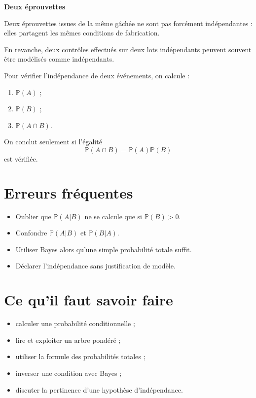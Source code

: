 \begin{Ex}
\textbf{Deux éprouvettes}

Deux éprouvettes issues de la même gâchée ne sont pas forcément indépendantes : elles partagent les mêmes conditions de fabrication.

En revanche, deux contrôles effectués sur deux lots indépendants peuvent souvent être modélisés comme indépendants.
\end{Ex}

\begin{Meth}
Pour vérifier l'indépendance de deux événements, on calcule :
\begin{enumerate}
    \item $\mathbb{P}(A)$ ;
    \item $\mathbb{P}(B)$ ;
    \item $\mathbb{P}(A\cap B)$.
\end{enumerate}

On conclut seulement si l'égalité
$$
\mathbb{P}(A\cap B)=\mathbb{P}(A)\mathbb{P}(B)
$$
est vérifiée.
\end{Meth}

\section{Erreurs fréquentes}

\begin{itemize}
    \item Oublier que $\mathbb{P}(A|B)$ ne se calcule que si $\mathbb{P}(B)>0$.
    \item Confondre $\mathbb{P}(A|B)$ et $\mathbb{P}(B|A)$.
    \item Utiliser Bayes alors qu'une simple probabilité totale suffit.
    \item Déclarer l'indépendance sans justification de modèle.
\end{itemize}

\section{Ce qu'il faut savoir faire}

\begin{itemize}
    \item calculer une probabilité conditionnelle ;
    \item lire et exploiter un arbre pondéré ;
    \item utiliser la formule des probabilités totales ;
    \item inverser une condition avec Bayes ;
    \item discuter la pertinence d'une hypothèse d'indépendance.
\end{itemize}

